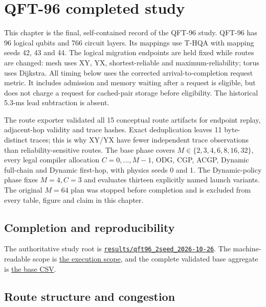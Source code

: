 \chapter{QFT-96 completed study}
\label{ch:qft96-focus}

This chapter is the final, self-contained record of the QFT-96 study. QFT-96
has 96 logical qubits and 766 circuit layers. Its mappings use T-HQA with
mapping seeds 42, 43 and 44. The logical migration endpoints are held fixed
while routes are changed: mesh uses XY, YX, shortest-reliable and
maximum-reliability; torus uses Dijkstra. All timing below uses the corrected
arrival-to-completion request metric. It includes admission and memory waiting
after a request is eligible, but does not charge a request for cached-pair
storage before eligibility. The historical 5.3-ms lead subtraction is absent.

The route exporter validated all 15 conceptual route artifacts for endpoint
replay, adjacent-hop validity and trace hashes. Exact deduplication leaves 11
byte-distinct traces; this is why XY/YX have fewer independent trace
observations than reliability-sensitive routes. The base phase covers
$M\in\{2,3,4,6,8,16,32\}$, every legal compiler allocation
$C=0,\ldots,M-1$, ODG, CGP, ACGP, Dynamic full-chain and Dynamic first-hop,
with physics seeds 0 and 1. The Dynamic-policy phase fixes $M=4,C=3$ and
evaluates thirteen explicitly named launch variants. The original $M=64$ plan
was stopped before completion and is excluded from every table, figure and
claim in this chapter.

\section{Completion and reproducibility}


The authoritative study root is
\href{https://github.com/sanjeevkrishnaa/Compiler-Driven-ACE/tree/codex/ace-scheduler-correctness/results/qft96_2seed_2026-10-26}{\texttt{results/qft96\_2seed\_2026-10-26}}.
The machine-readable scope is
\href{https://github.com/sanjeevkrishnaa/Compiler-Driven-ACE/blob/codex/ace-scheduler-correctness/results/qft96_2seed_2026-10-26/execution_scope.json}{the execution scope},
and the complete validated base aggregate is
\href{https://github.com/sanjeevkrishnaa/Compiler-Driven-ACE/blob/codex/ace-scheduler-correctness/results/qft96_2seed_2026-10-26/summaries/base-evaluation-progress.csv}{the base CSV}.

\section{Route structure and congestion}


